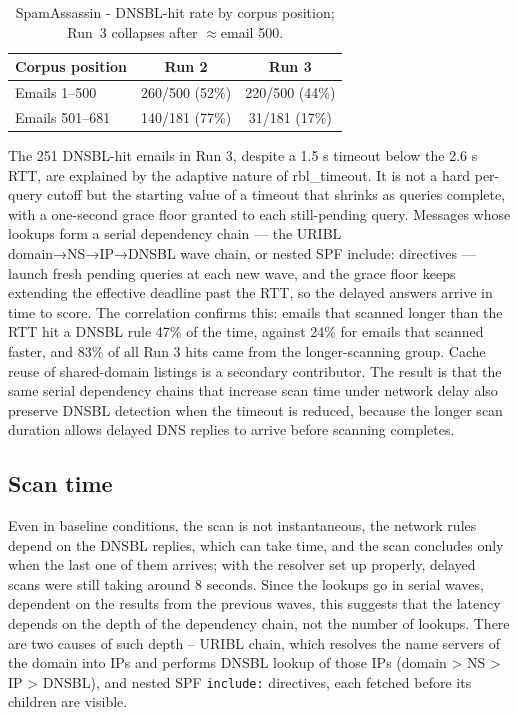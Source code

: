 \begin{table}[H]\centering
\small
\begin{tabular}{@{}lcc@{}}
\toprule
Corpus position & Run 2 & Run 3 \\
\midrule
Emails 1--500   & 260/500 (52\%) & 220/500 (44\%) \\
Emails 501--681 & 140/181 (77\%) & 31/181 (17\%) \\
\bottomrule
\end{tabular}
\caption{SpamAssassin - DNSBL-hit rate by corpus position; Run~3 collapses after
$\approx$email 500.}
\label{tab:sa-collapse}
\end{table}

The 251 DNSBL-hit emails in Run 3, despite a 1.5 s timeout below the 2.6 s RTT, are explained by the adaptive nature of rbl\_timeout. It is not a hard per-query cutoff but the starting value of a timeout that shrinks as queries complete, with a one-second grace floor granted to each still-pending query. Messages whose lookups form a serial dependency chain — the URIBL domain→NS→IP→DNSBL wave chain, or nested SPF include: directives — launch fresh pending queries at each new wave, and the grace floor keeps extending the effective deadline past the RTT, so the delayed answers arrive in time to score. The correlation confirms this: emails that scanned longer than the RTT hit a DNSBL rule 47\% of the time, against 24\% for emails that scanned faster, and 83\% of all Run 3 hits came from the longer-scanning group. Cache reuse of shared-domain listings is a secondary contributor. The result is that the same serial dependency chains that increase scan time under network delay also preserve DNSBL detection when the timeout is reduced, because the longer scan duration allows delayed DNS replies to arrive before scanning completes.

\subsection{Scan time}

Even in baseline conditions, the scan is not instantaneous, the network rules depend
on the DNSBL replies, which can take time, and the scan concludes only when the
last one of them arrives; with the resolver set up properly, delayed scans were still taking around 8 seconds. Since the lookups go in serial waves, dependent on the results from the previous waves, this suggests that the latency depends on the depth of the dependency chain, not the number of lookups. There are two causes of such depth – URIBL chain, which resolves the name servers of the domain into IPs and performs DNSBL lookup of those IPs (domain > NS > IP > DNSBL), and nested SPF \texttt{include:} directives, each fetched before its children are visible.

